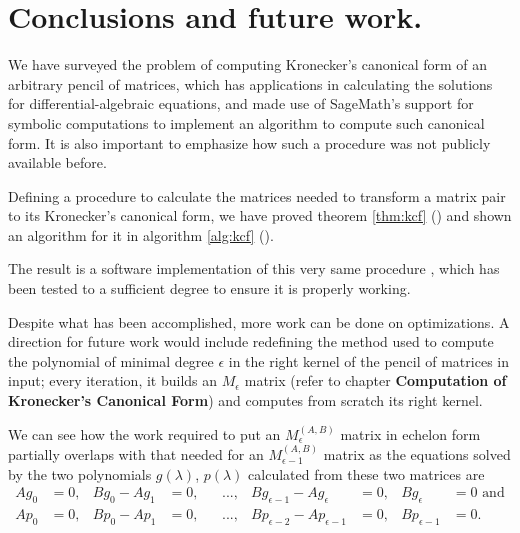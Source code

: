 \section{Conclusions and future work.}
We have surveyed the problem of computing Kronecker's canonical form of an arbitrary pencil of matrices, which has
applications in calculating the solutions for differential-algebraic equations, and made use of SageMath's \cite{sage}
support for symbolic computations to implement an algorithm to compute such canonical form. It is also important
to emphasize how such a procedure was not publicly available before.

Defining a procedure to calculate the matrices needed to transform a matrix pair to its Kronecker's canonical form,
we have proved theorem \ref{thm:kcf} () and shown an algorithm for it in
algorithm \ref{alg:kcf} ().

The result is a software implementation of this very same procedure \cite{trapani-kronecker},
which has been tested to a sufficient degree to ensure it is properly working.

Despite what has been accomplished, more work can be done on optimizations. A direction for future work
would include redefining the method used to compute the polynomial of minimal degree \(\epsilon\) in the right kernel of
the pencil of matrices in input; every iteration, it builds an \(M_\epsilon\) matrix (refer to chapter
\textbf{Computation of Kronecker's Canonical Form}) and computes from scratch its right kernel.

We can see how the work required to put an \(M_{\epsilon}^{(A, B)}\) matrix in echelon form partially
overlaps with that needed for an \(M_{\epsilon-1}^{(A, B)}\) matrix as the equations solved by the two polynomials
\(g(\lambda)\), \(p(\lambda)\) calculated from these two matrices are
\begin{align*}
    Ag_{0} &= 0, &
    Bg_{0} - Ag_{1} &= 0, &
    & ..., &
    Bg_{\epsilon-1} - Ag_{\epsilon} &= 0, &
    Bg_{\epsilon} &= 0 \text{ and} \\
    Ap_{0} &= 0, &
    Bp_{0} - Ap_{1} &= 0, &
    & ..., &
    Bp_{\epsilon-2} - Ap_{\epsilon-1} &= 0, &
    Bp_{\epsilon-1} &= 0.
\end{align*}